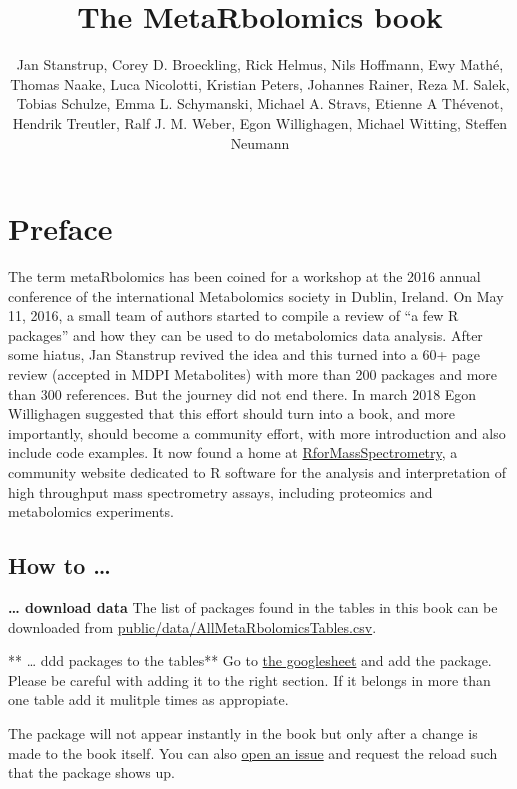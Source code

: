 \documentclass[]{article}
\title{The MetaRbolomics book}
\author{Jan Stanstrup, Corey D. Broeckling, Rick Helmus, Nils Hoffmann, Ewy Mathé, Thomas Naake, Luca Nicolotti, Kristian Peters, Johannes Rainer, Reza M. Salek, Tobias Schulze, Emma L. Schymanski, Michael A. Stravs, Etienne A Thévenot, Hendrik Treutler, Ralf J. M. Weber, Egon Willighagen, Michael Witting, Steffen Neumann}
\date{}
\begin{document}
\maketitle

{
\setcounter{tocdepth}{2}
\tableofcontents
}
\newpage

\hypertarget{preface}{%
\section*{Preface}\label{preface}}

The term metaRbolomics has been coined for a workshop at the 2016
annual conference of the international Metabolomics society in Dublin,
Ireland. On May 11, 2016, a small team of authors started to compile a
review of ``a few R packages'' and how they can be used to do
metabolomics data analysis. After some hiatus, Jan Stanstrup revived
the idea and this turned into a 60+ page review (accepted in MDPI
Metabolites) with more than 200 packages and more than 300
references. But the journey did not end there. In march 2018 Egon
Willighagen suggested that this effort should turn into a book, and
more importantly, should become a community effort, with more
introduction and also include code examples. It now found a home at
\href{https://rformassspectrometry.github.io/RforMassSpectrometry/}{RforMassSpectrometry},
a community website dedicated to R software for the analysis and
interpretation of high throughput mass spectrometry assays, including
proteomics and metabolomics experiments.

\hypertarget{how-to}{%
\subsection*{How to \ldots{}}\label{how-to}}

\textbf{\ldots{} download data}
The list of packages found in the tables in this book can be downloaded from
\url{public/data/AllMetaRbolomicsTables.csv}.

** \ldots{} ddd packages to the tables**
Go to \href{https://docs.google.com/spreadsheets/d/1QTe_FhiiFEJJ7hn25V973OV3Y9up8CsiLXgZXgTg_UU/edit?usp=sharing}{the googlesheet}
and add the package. Please be careful with adding it to the right section.
If it belongs in more than one table add it mulitple times as appropiate.

The package will not appear instantly in the book but only after a change is made to
the book itself. You can also \href{https://github.com/rformassspectrometry/metaRbolomics-book/issues}{open an issue}
and request the reload such that the package shows up.
\end{document}
